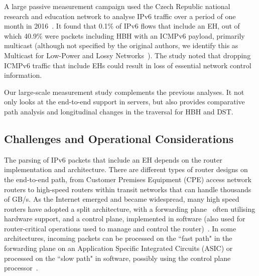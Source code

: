 \documentclass[conference]{IEEEtran}
\begin{document}

A large passive measurement campaign used the Czech Republic national
research and education network to analyse IPv6 traffic over a period of one month in
2016~\cite{passive-threats}. It found that 0.1\% of IPv6 flows
that include an EH, out of which 40.9\% were packets including HBH with an ICMPv6
payload, primarily multicast (although not specified by the original authors,
we identify this as Multicast for Low-Power and Lossy Networks~\cite{RFC7731}).
The study noted that dropping ICMPv6 traffic that include EHs could result in
loss of essential network control information. 


Our large-scale measurement study complements the previous analyses. It not only
looks at the end-to-end support in servers, but also provides comparative path
analysis and longitudinal changes in the traversal for HBH and DST.

\subsection{Challenges and Operational Considerations}

The parsing of IPv6 packets that include an EH depends on 
the router implementation and architecture. There are different types of router designs on the end-to-end path, from Customer Premises Equipment (CPE) access network routers to high-speed routers within transit networks that can handle thousands of GB/s. As the Internet emerged and became widespread, many high speed routers have adopted a split architecture, 
with a forwarding plane~\cite{RFC3654} often utilising hardware support, and a control plane, implemented in software (also used for router-critical operations used to manage and control the router)~\cite{router-architecture}.
In some architectures, incoming packets can be processed on the ``fast path" in the forwarding plane on an Application Specific Integrated Circuits (ASIC) or processed on the ``slow path" in software, possibly using the control plane processor~\cite{RFC3654}.
\end{document}
